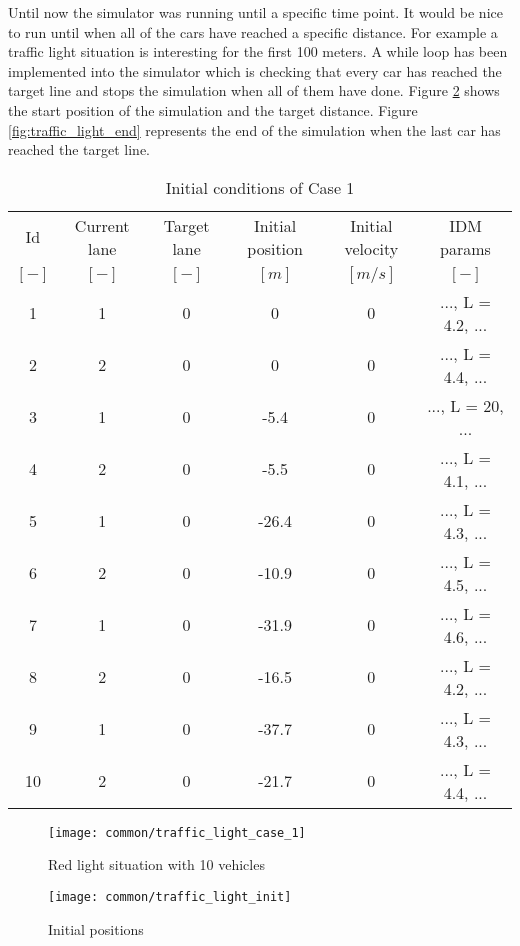 		Until now the simulator was running until a specific time point. It would be nice to run until when all of the cars have reached a specific distance. For example a traffic light situation is interesting for the first 100 meters. A while loop has been implemented into the simulator which is checking that every car has reached the target line and stops the simulation when all of them have done. Figure \ref{fig:traffic_light_init} shows the start position of the simulation and the target distance. Figure \ref{fig:traffic_light_end} represents the end of the simulation when the last car has reached the target line.
		\begin{table}
			\begin{center}
				\begin{tabular}{ |c|c|c|c|c|c| }
					\hline
					Id & Current lane & Target lane & Initial position & Initial velocity& IDM params\\
					$[-]$ & $[-]$ & $[-]$ & $[m]$ & $[m/s]$ & $[-]$\\
					\hline
					1 & 1 & 0 & 0 & 0 & ..., L = 4.2, ... \\
					2 & 2 & 0 & 0 & 0 & ..., L = 4.4, ... \\
					3 & 1 & 0 & -5.4 & 0 & ..., L = 20, ... \\
					4 & 2 & 0 & -5.5 & 0 & ..., L = 4.1, ... \\
					5 & 1 & 0 & -26.4 & 0 & ..., L = 4.3, ... \\
					6 & 2 & 0 & -10.9 & 0 & ..., L = 4.5, ... \\
					7 & 1 & 0 & -31.9 & 0 & ..., L = 4.6, ... \\
					8 & 2 & 0 & -16.5 & 0 & ..., L = 4.2, ... \\
					9 & 1 & 0 & -37.7 & 0 & ..., L = 4.3, ... \\
					10 & 2 & 0 & -21.7 & 0 & ..., L = 4.4, ... \\
					\hline
				\end{tabular}
			\end{center}
			\caption{Initial conditions of Case 1}
			\label{tab:case_1_definition_array}
		\end{table}
		\begin{figure}
			\centering
			\texttt{[image: common/traffic\_light\_case\_1]}
			\caption{Red light situation with 10 vehicles}
			\label{fig:red_light_situation}
		\end{figure}
		\begin{figure}
			\centering
			\texttt{[image: common/traffic\_light\_init]}
			\caption{Initial positions}
			\label{fig:traffic_light_init}
		\end{figure}
